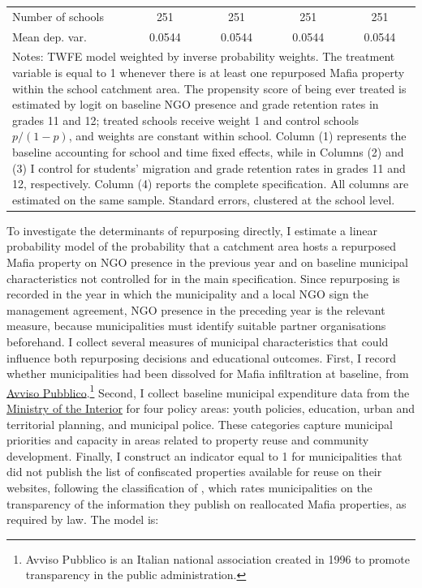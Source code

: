 \documentclass[12pt]{article}
\theoremstyle{plain}
\theoremstyle{plain}
\theoremstyle{plain}
\theoremstyle{definition}
\theoremstyle{plain}
\theoremstyle{definition}
\theoremstyle{plain}
\theoremstyle{remark}
\theoremstyle{definition}
\theoremstyle{definition}
\theoremstyle{plain}
\begin{document}
\begin{table}[H]
{\begin{tabular}{p{7.645em}llll}
    \multicolumn{1}{l}{Number of schools} & \multicolumn{1}{c}{251} & \multicolumn{1}{c}{251} & \multicolumn{1}{c}{251} & \multicolumn{1}{c}{251} \\
    \multicolumn{1}{l}{Mean dep. var.} & \multicolumn{1}{c}{0.0544} & \multicolumn{1}{c}{0.0544} & \multicolumn{1}{c}{0.0544} & \multicolumn{1}{c}{0.0544} \\
    \midrule
    \multicolumn{5}{p{32.505em}}{Notes: TWFE model weighted by inverse probability weights. The treatment variable is equal to 1 whenever there is at least one repurposed Mafia property within the school catchment area. The propensity score of being ever treated is estimated by logit on baseline NGO presence and grade retention rates in grades 11 and 12; treated schools receive weight 1 and control schools $p/(1-p)$, and weights are constant within school. Column (1) represents the baseline accounting for school and time fixed effects, while in Columns (2) and (3) I control for students' migration and grade retention rates in grades 11 and 12, respectively. Column (4) reports the complete specification. All columns are estimated on the same sample. Standard errors, clustered at the school level.} \\
    \end{tabular}
}
\end{table}

To investigate the determinants of repurposing directly, I estimate a linear probability model of the probability that a catchment area hosts a repurposed Mafia property on NGO presence in the previous year and on baseline municipal characteristics not controlled for in the main specification. Since repurposing is recorded in the year in which the municipality and a local NGO sign the management agreement, NGO presence in the preceding year is the relevant measure, because municipalities must identify suitable partner organisations beforehand.
I collect several measures of municipal characteristics that could influence both repurposing decisions and educational outcomes. First, I record whether municipalities had been dissolved for Mafia infiltration at baseline, from \href{https://www.avvisopubblico.it/home/home/cosa-facciamo/informare/documenti-tematici/comuni-sciolti-per-mafia/}{Avviso Pubblico}.\footnote{Avviso Pubblico is an Italian national association created in 1996 to promote transparency in the public administration.} Second, I collect baseline municipal expenditure data from the \href{https://finanzalocale.interno.gov.it/banchedati.html}{Ministry of the Interior} for four policy areas: youth policies, education, urban and territorial planning, and municipal police. These categories capture municipal priorities and capacity in areas related to property reuse and community development. Finally, I construct an indicator equal to 1 for municipalities that did not publish the list of confiscated properties available for reuse on their websites, following the classification of \citet{falcone_rimandati_2021, falcone_rimandati_2022}, which rates municipalities on the transparency of the information they publish on reallocated Mafia properties, as required by law. The model is:\par
\end{document}
